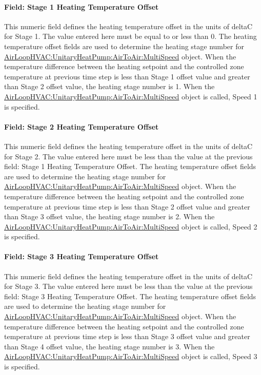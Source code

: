 \paragraph{Field: Stage 1 Heating Temperature Offset}\label{field-stage-1-heating-temperature-offset}

This numeric field defines the heating temperature offset in the units of deltaC for Stage 1. The value entered here must be equal to or less than 0. The heating temperature offset fields are used to determine the heating stage number for \hyperref[airloophvacunitaryheatpumpairtoairmultispeed]{AirLoopHVAC:UnitaryHeatPump:AirToAir:MultiSpeed} object. When the temperature difference between the heating setpoint and the controlled zone temperature at previous time step is less than Stage 1 offset value and greater than Stage 2 offset value, the heating stage number is 1. When the \hyperref[airloophvacunitaryheatpumpairtoairmultispeed]{AirLoopHVAC:UnitaryHeatPump:AirToAir:MultiSpeed} object is called, Speed 1 is specified.

\paragraph{Field: Stage 2 Heating Temperature Offset}\label{field-stage-2-heating-temperature-offset}

This numeric field defines the heating temperature offset in the units of deltaC for Stage 2. The value entered here must be less than the value at the previous field: Stage 1 Heating Temperature Offset. The heating temperature offset fields are used to determine the heating stage number for \hyperref[airloophvacunitaryheatpumpairtoairmultispeed]{AirLoopHVAC:UnitaryHeatPump:AirToAir:MultiSpeed} object. When the temperature difference between the heating setpoint and the controlled zone temperature at previous time step is less than Stage 2 offset value and greater than Stage 3 offset value, the heating stage number is 2. When the \hyperref[airloophvacunitaryheatpumpairtoairmultispeed]{AirLoopHVAC:UnitaryHeatPump:AirToAir:MultiSpeed} object is called, Speed 2 is specified.

\paragraph{Field: Stage 3 Heating Temperature Offset}\label{field-stage-3-heating-temperature-offset}

This numeric field defines the heating temperature offset in the units of deltaC for Stage 3. The value entered here must be less than the value at the previous field: Stage 3 Heating Temperature Offset. The heating temperature offset fields are used to determine the heating stage number for \hyperref[airloophvacunitaryheatpumpairtoairmultispeed]{AirLoopHVAC:UnitaryHeatPump:AirToAir:MultiSpeed} object. When the temperature difference between the heating setpoint and the controlled zone temperature at previous time step is less than Stage 3 offset value and greater than Stage 4 offset value, the heating stage number is 3. When the \hyperref[airloophvacunitaryheatpumpairtoairmultispeed]{AirLoopHVAC:UnitaryHeatPump:AirToAir:MultiSpeed} object is called, Speed 3 is specified.

